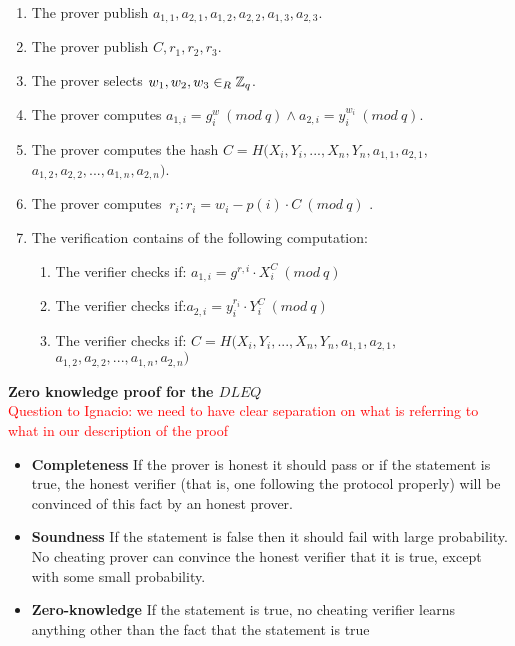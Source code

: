 \begin{enumerate}
    \item The prover publish $a_{1,1},a_{2,1},a_{1,2},a_{2,2},a_{1,3},a_{2,3}$.
    \item The prover publish $C,r_1,r_2,r_3$.
    \item The prover selects  $w_1, w_2,w_3\in_R \mathbb{Z}_q$.
    \item The prover computes $a_{1,i}=g^w_i \ (mod\ q) \land a_{2,i}=y_i^{w_i} \ (mod\ q)$.
    \item The prover computes the hash  $C=H(X_i,Y_i,...,X_n,Y_n,a_{1,1},a_{2,1},$\\
$a_{1,2},a_{2,2},...,a_{1,n},a_{2,n})$.
    \item The prover computes $\ r_i:  r_i=w_i-p(i)  \cdot  C \ (mod\ q)$ .
    \item The verification contains of the following computation:
    \begin{enumerate}        
        \item The verifier checks if: $a_{1,i} = g^{r,i} \cdot X_i^C \ (mod\ q) $
        \item The verifier checks if:$a_{2,i} =y_i^{r_{i}}  \cdot  Y_i^C \ (mod\ q)  $ 
         \item The verifier checks if: $C=H(X_i,Y_i,...,X_n,Y_n,a_{1,1},a_{2,1},$\\
$a_{1,2},a_{2,2},...,a_{1,n},a_{2,n})$
    \end{enumerate}
\end{enumerate}



\noindent
\textbf{Zero knowledge proof for the $DLEQ$}\\
\textcolor{red}{Question to Ignacio: we need to have clear separation on what is referring to what in our description of the proof}
\begin{itemize}
    
    \item \textbf{Completeness} If the prover is honest it should pass or if the statement is true, the honest verifier (that is, one following the protocol properly) will be convinced of this fact by an honest prover.
    
    \item \textbf{Soundness} If the statement is false then it should fail with large probability. No cheating prover can convince
the honest verifier that it is true, except with some small probability.
    
    
    \item \textbf{Zero-knowledge}  If the statement is true, no cheating verifier learns anything other than the fact that the statement is true
\end{itemize}


